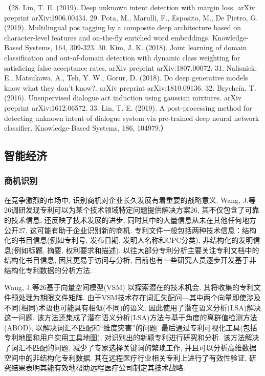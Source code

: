 \documentclass{Style/aas}
\begin{document}
\begin{multicols}{2}
  （28.	Lin, T. E. (2019). Deep unknown intent detection with margin loss. arXiv preprint arXiv:1906.00434.
  29.	Pota, M., Marulli, F., Esposito, M., De Pietro, G. (2019). Multilingual pos tagging by a composite deep architecture based on character-level features and on-the-fly enriched word embeddings. Knowledge-Based Systems, 164, 309-323.
  30.	Kim, J. K. (2018). Joint learning of domain classification and out-of-domain detection with dynamic class weighting for satisficing false acceptance rates. arXiv preprint arXiv:1807.00072.
  31.	Nalisnick, E., Matsukawa, A., Teh, Y. W., Gorur, D. (2018). Do deep generative models know what they don't know?. arXiv preprint arXiv:1810.09136.
  32.	Brychcín, T. (2016). Unsupervised dialogue act induction using gaussian mixtures. arXiv preprint arXiv:1612.06572.
  33.	Lin, T. E. (2019). A post-processing method for detecting unknown intent of dialogue system via pre-trained deep neural network classifier. Knowledge-Based Systems, 186, 104979.）

  \subsection{智能经济}
  \subsubsection{商机识别}
  在竞争激烈的市场中, 识别商机对企业长久发展有着重要的战略意义. Wang, J.等26调研发现专利可以为某个技术领域特定问题提供解决方案26, 其不仅包含了可靠的技术信息, 还反映了技术发展的进步, 同时其中的大量信息从未在其他任何地方公开27, 这可能有助于企业识别新的商机. 专利文件一般包括两种技术信息：结构化的书目信息(例如专利号, 发布日期, 发明人名称和CPC分类), 非结构化的发明信息(例如标题, 摘要, 权利要求和描述). 以往大部分专利分析主要关注专利文档中的结构化书目信息, 因其更易于访问与分析, 目前也有一些研究人员逐步开发基于非结构化专利数据的分析方法.

  Wang, J.等26基于向量空间模型(VSM) 以探索潜在的技术机会. 其将收集的专利文件预处理为期限文件矩阵. 由于VSM技术存在词汇失配问—其中两个向量即使涉及不同(相同)术语也可能具有相似(不同)的语义, 因此使用了潜在语义分析(LSA)解决这一问题. 该方法还集成了潜在语义分析(LSA)方法与基于角度的离群值检测方法(ABOD), 以解决词汇不匹配和“维度灾害”的问题. 最后通过专利可视化工具(包括专利地图和用户实用工具地图), 对识别出的新颖专利进行研究和分析. 该方法解决了词汇不匹配的问题, 减少了专家选择关键词的繁琐工作, 并且可以分析高维数据空间中的非结构化专利数据. 其在远程医疗行业相关专利上进行了有效性验证, 研究结果表明其能有效地帮助远程医疗公司制定其技术战略.


\end{multicols}
\end{document}
